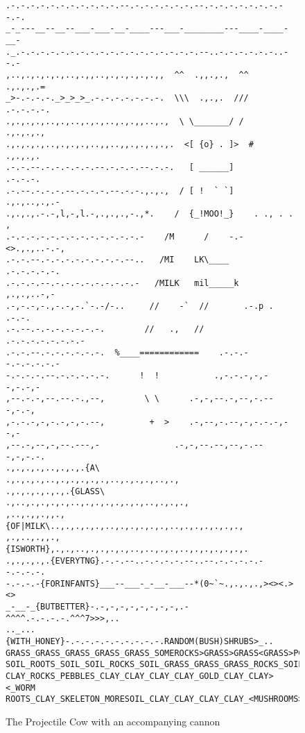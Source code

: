 \documentclass{metanorma}
\begin{document}
\begin{figure}[h]\centering
  \label{projectile-cow}
  \caption{The Projectile Cow with an accompanying cannon}
\begin{verbatim}
.-.-.-.-.-.-.-.-.-.-.-.--.-.-.-.-.-.-.--.-.-.-.-.-.-.-.--.-.
_-_---__--__--___-___-__-____---___-________---____-____-__-
._.-.-.-.-.-.-.-.-.-.-.-.-.-.-.-.-.-.-.--..-.-.-.-.-.-..--.-
,..,.,.,.,.,..,.,,..,.,.,.,.,.,,  ^^  .,,.,.,  ^^   .,.,.,.=
_>-.-.-.-._>_>_>_.-.-.-.-.-.-.-.  \\\  .,.,.  ///  .-.-.-.-.
.,.,.,.,..,.,..,.,.,..,.,.,,..,.,  \ \_______/ /    .,.,.,.,
.,.,.,.,..,.,.,.,..,,..,,.,.,.,.,.  <[ {o} . ]>  #   .,.,.,.
.-.-.--.-.-.-.-.-.--.-.-.-.--.-.-.   [ ______]       .-.-.-.
.-.--.-.-.-.--.-.-.-.--.-.-.,.,.,  / [ !  ` `]   .,.,..,.,.-
.,.,.,.-.-,l,-,l.-,.,.,.,-.,*.    /  {_!MOO!_}    . ., . . ,
.-.-.-.-.-.-.-.-.-.-.-.-.-.-    /M      /    -.-<>.,.,..-.-,
.-.-.--.-.-.-.-.-.-.-.-.--..   /MI    LK\____    .-.-.-.-.-.
.-.-.-.--.-.-.-.-.-.-.-.-.-   /MILK   mil_____k   ,.,.,..-,-
.-,-.-,-.,-.-,-.`-.-/-..     //    -`  //       .-.p . .-.-.
.-.--.-.-.-.-.-.-.-.        //   .,   //    .-.-.-.-.-.-.-.-
.-.-.--.-.-.-.-.-.-.  %____============    .-.-.--.-.-.-.-.-
-.-.-.-.--.-.-.-.-.-.      !  !           .,-.-.-,-,--,-.-,-
,--.-.-,--.--.-.,--,        \ \      .-,-,--.-,--,-.---,-.-,
,-.-.-,-,-.-,-,-.--,         +  >    .-,--,-.--,-,-.-.-,--,-
,--.-,--,-,--.---,-               .-,-,--.--,--,-.---,-,-.-.
.,.,.,.,..,.,.,.{A\      .,.,.,.,..,.,.,.,.,.,..,.,.,.,..,.,
.,.,.,.,.,.,.{GLASS\   .,..,.,.,.,.,..,.,.,.,.,.,.,..,.,.,.,
,..,.,,.,,.,{OF|MILK\..,.,.,.,.,..,.,.,.,.,.,..,.,.,.,.,.,.,
,.,..,.,,.,{ISWORTH},.,.,..,.,.,.,.,..,..,.,.,..,.,.,.,.,.,.
.,.,.,.,.{EVERYTNG}.-.-.--..-.-.-.-.--..--.-.-.-.-.--.-.-.-.
-.-.-.-{FORINFANTS}___--___-_-__-___--*(0~`~.,.,.,.,><><.><>
_-__-_{BUTBETTER}-.-,-,-,-,-,-,-,-,.-^^^^.-.-.-.-.^^^7>>>,..
.._...{WITH_HONEY}-.-.-.-.-.-.-.-.-.-.RANDOM(BUSH)SHRUBS>_..
GRASS_GRASS_GRASS_GRASS_GRASS_SOMEROCKS>GRASS>GRASS<GRASS>PC
SOIL_ROOTS_SOIL_SOIL_ROCKS_SOIL_GRASS_GRASS_GRASS_ROCKS_SOIL
CLAY_ROCKS_PEBBLES_CLAY_CLAY_CLAY_CLAY_GOLD_CLAY_CLAY><_WORM
ROOTS_CLAY_SKELETON_MORESOIL_CLAY_CLAY_CLAY_CLAY_<MUSHROOMS>
\end{verbatim}
\end{figure}
\end{document}

